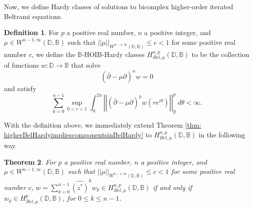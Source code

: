 \documentclass[12pt,reqno]{amsart}
\newtheorem{theorem}{Theorem}[section]
\theoremstyle{definition}
\newtheorem{deff}[theorem]{Definition}
\theoremstyle{remark}
\newcommand{\p}{\partial}
\newcommand{\dbar}{\bar\partial}
\newcommand{\bc}{\mathbb{B}}
\newcommand{\disk}{\mathbb{D}}
\begin{document}
Now, we define Hardy classes of solutions to bicomplex higher-order iterated Beltrami equations.

\begin{deff}
    For $p$ a positive real number, $n$ a positive integer, and $\mu \in W^{n-1,\infty}(\disk,\bc)$ such that $||\mu||_{W^{n-1,\infty}(\disk,\bc)}\leq c < 1$ for some positive real number $c$, we define the $\bc$-HOIB-Hardy classes $H^{n,p}_{Bel,\mu}(\disk,\bc)$ to be the collection of functions $w:\disk\to\bc$ that solve
    \[
     \left( \dbar - \mu\p \right)^n w  = 0
     \]
    and satisfy
    \[
        \sum_{k=0}^{n-1} \sup_{0 < r< 1}\int_0^{2\pi} \left|\left|\left( \dbar - \mu\p \right)^k w(re^{i\theta})\right|\right|_\bc^p\,d\theta < \infty.
    \]
\end{deff}

With the definition above, we immediately extend Theorem \ref{thm: higherBelHardyimpliescomponentsinBelHardy} to $H^{n,p}_{Bel,\mu}(\disk,\bc)$ in the following way.

\begin{theorem}\label{thm: bchoibinclusion}
For $p$ a positive real number, $n$ a positive integer, and $\mu \in W^{n-1,\infty}(\disk,\bc)$ such that $||\mu||_{W^{n-1,\infty}(\disk,\bc)}\leq c < 1$ for some positive real number $c$, $w = \sum_{k=0}^{n-1} \widehat{ (z^*)}^k w_k \in H^{n,p}_{Bel,\mu}(\disk,\bc)$ if and only if $w_k \in H^p_{Bel,\mu}(\disk,\bc)$, for $0 \leq k \leq n-1$. 
\end{theorem}
\end{document}

